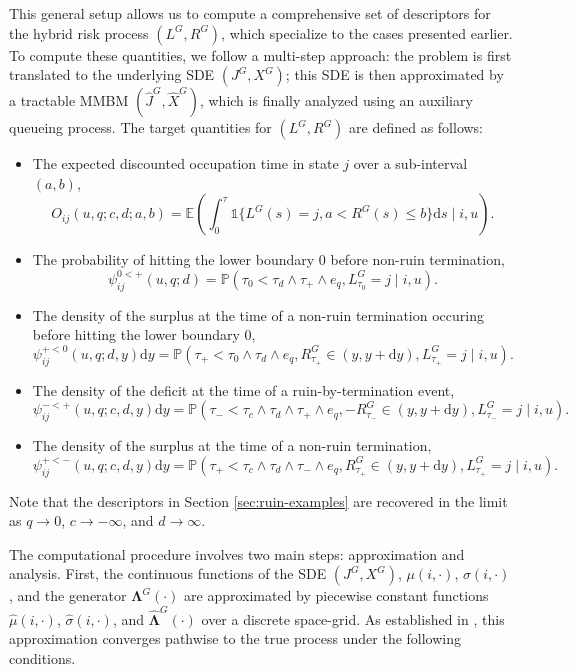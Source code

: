 \documentclass[11pt]{article}
\numberwithin{table}{section}
\numberwithin{figure}{section}
\numberwithin{equation}{section}
\newcommand{\dd}{\mathrm{d}}
\newcommand{\1}{{\mathbf 1}}
\newcommand{\0}{\mat{0}}
\begin{document}
This general setup allows us to compute a comprehensive set of descriptors for the hybrid risk process $(L^G, R^G)$, which specialize to the cases presented earlier. { To compute these quantities, we follow a multi-step approach: the problem is first translated to the underlying SDE $(J^G, X^G)$; this SDE is then approximated by a tractable MMBM $(\hat{J}^G, \hat{X}^G)$, which is finally analyzed using an auxiliary queueing process. The target quantities for $(L^G, R^G)$ are defined as follows:}
\begin{itemize}
    \item The expected discounted occupation time in state $j$ over a sub-interval $(a,b)$,
    \[
    O_{ij}(u,q;c,d;a,b)=\mathbb{E}\left(\int_{0}^{\tau}\mathds{1}\{L^G(s)=j, a < R^G(s) \le b\}\dd s \mid i,u \right).
    \]
    \item The probability of hitting the lower boundary $0$ before non-ruin termination,
    \[
    \psi_{ij}^{0 < +}(u, q; d) = \mathbb{P}(\tau_0 < \tau_d \wedge \tau_+ \wedge e_q, L^G_{\tau_0} = j \mid i,u).
    \]
    \item The density of the surplus at the time of a non-ruin termination occuring before hitting the lower boundary 0,
    \[
    \psi_{ij}^{+<0}(u, q; d, y) \dd y = \mathbb{P}(\tau_+ < \tau_0 \wedge \tau_d \wedge e_q, R^G_{\tau_+} \in (y, y+\dd y), L^G_{\tau_+} = j \mid i,u).
    \]
    \item The density of the deficit at the time of a ruin-by-termination event,
    \[
    \psi_{ij}^{-<+}(u, q; c,d, y) \dd y = \mathbb{P}(\tau_- < \tau_c \wedge \tau_d \wedge \tau_+ \wedge e_q, -R^G_{\tau_-} \in (y, y+\dd y), L^G_{\tau_-} = j \mid i,u).
    \]
    \item The density of the surplus at the time of a non-ruin termination,
    \[
    \psi_{ij}^{+<-}(u, q; c,d, y) \dd y = \mathbb{P}(\tau_+ < \tau_c \wedge \tau_d \wedge \tau_- \wedge e_q, R^G_{\tau_+} \in (y, y+\dd y), L^G_{\tau_+} = j \mid i,u).
    \]
\end{itemize}
Note that the descriptors in Section \ref{sec:ruin-examples} are recovered in the limit as $q \to 0$, $c\to-\infty$, and $d\to\infty$.

The computational procedure involves two main steps: approximation and analysis. First, the continuous functions of the SDE $(J^G,X^G)$, $\mu(i,\cdot)$, $\sigma(i,\cdot)$, and the generator $\bm{\Lambda}^G(\cdot)$ are approximated by piecewise constant functions $\hat{\mu}(i,\cdot)$, $\hat{\sigma}(i,\cdot)$, and $\hat{\bm{\Lambda}}^G(\cdot)$ over a discrete space-grid. As established in \cite{albrecher2022space}, this approximation converges pathwise to the true process under the following conditions.
\end{document}
